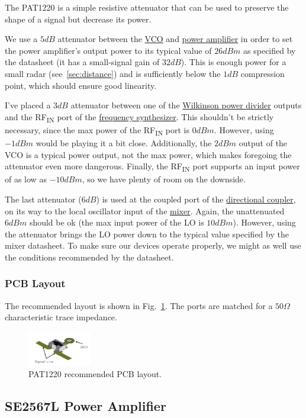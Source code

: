 The PAT1220 is a simple resistive attenuator that can be used to preserve the shape of a signal but
decrease its power.

We use a $5 \si{dB}$ attenuator between the \hyperref[sec:hmc431lp4rf]{VCO} and
\hyperref[sec:se2567l]{power amplifier} in order to set the power amplifier's output power to its
typical value of $26 \si{dBm}$ as specified by the datasheet (it has a small-signal gain of
$32 \si{dB}$). This is enough power for a small radar (see~\cref{sec:distance}) and is sufficiently
below the $1 \si{dB}$ compression point, which should ensure good linearity.

I've placed a $3 \si{dB}$ attenuator between one of the \hyperref[sec:pd4859j5050s2hf]{Wilkinson
  power divider} outputs and the RF\textsubscript{IN} port of the \hyperref[sec:adf4158]{frequency
  synthesizer}. This shouldn't be strictly necessary, since the max power of the
RF\textsubscript{IN} port is $0 \si{dBm}$. However, using $-1 \si{dBm}$ would be playing it a bit
close. Additionally, the $2 \si{dBm}$ output of the VCO is a typical power output, not the max
power, which makes foregoing the attenuator even more dangerous. Finally, the RF\textsubscript{IN}
port supports an input power of as low as $-10 \si{dBm}$, so we have plenty of room on the downside.

The last attenuator ($6 \si{dB}$) is used at the coupled port of the
\hyperref[sec:dc4759j5020ahf]{directional coupler}, on its way to the local oscillator input of the
\hyperref[sec:adl5802]{mixer}. Again, the unattenuated $6 \si{dBm}$ should be ok (the max input
power of the LO is $10 \si{dBm}$). However, using the attenuator brings the LO power down to the
typical value specified by the mixer datasheet. To make sure our devices operate properly, we might
as well use the conditions recommended by the datasheet.

\subsubsection{PCB Layout}
\label{sec:pat1220-pcb-layout}

The recommended layout is shown in Fig.~\ref{fig:pat1220-pcb}. The ports are matched for a $50
\si{\Omega}$ characteristic trace impedance.

\begin{figure}[h]
        \centering
        \includegraphics[width=0.25\textwidth]{data/pat1220-pcb}
        \caption{PAT1220 recommended PCB layout.}
        \label{fig:pat1220-pcb}
\end{figure}

\subsection{SE2567L Power Amplifier}
\label{sec:se2567l-power-amp}


